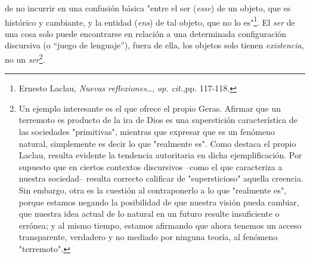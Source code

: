 \documentclass{book}
\begin{document}
de no incurrir en una confusión básica "entre el ser (\emph{esse}) de un
objeto, que es histórico y cambiante, y la entidad (\emph{ens}) de tal
objeto, que no lo es"\footnote{Ernesto Laclau, \emph{Nuevas
  reflexiones\ldots{}}, \emph{op. cit}.,pp. 117-118.}. El \emph{ser} de
una cosa solo puede encontrarse en relación a una determinada
configuración discursiva (o ``juego de lenguaje''), fuera de ella, los
objetos solo tienen \emph{existencia}, no un \emph{ser}\footnote{Un
  ejemplo interesante es el que ofrece el propio Geras. Afirmar que un
  terremoto es producto de la ira de Dios es una superstición
  característica de las sociedades "primitivas", mientras que expresar
  que es un fenómeno natural, simplemente es decir lo que "realmente
  es". Como destaca el propio Laclau, resulta evidente la tendencia
  autoritaria en dicha ejemplificación. Por supuesto que en ciertos
  contextos discursivos --como el que caracteriza a nuestra sociedad--
  resulta correcto calificar de "supersticioso" aquella creencia. Sin
  embargo, otra es la cuestión al contraponerlo a lo que "realmente es",
  porque estamos negando la posibilidad de que nuestra visión pueda
  cambiar, que nuestra idea actual de lo natural en un futuro resulte
  insuficiente o errónea; y al mismo tiempo, estamos afirmando que ahora
  tenemos un acceso transparente, verdadero y no mediado por ninguna
  teoría, al fenómeno "terremoto".}.
\end{document}
